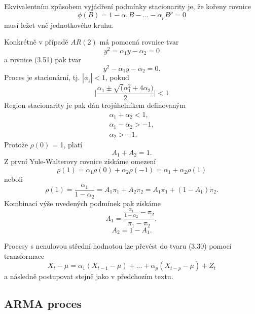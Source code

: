 Ekvivalentním způsobem vyjádření podmínky stacionarity je, že kořeny rovnice
\begin{equation}
\phi(B) = 1 - \alpha_1 B - ... - \alpha_p B^p = 0
\end{equation}
musí ležet vně jednotkového kruhu.

Konkrétně v případě $AR(2)$ má pomocná rovnice tvar
\begin{equation}
y^2 = \alpha_1 y - \alpha_2 = 0
\end{equation}
a rovnice (3.51) pak tvar
\begin{equation}
y^2 - \alpha_1 y - \alpha_2 = 0.
\end{equation}
Proces je stacionární, tj. $|\phi_i| < 1$, pokud
\begin{equation}
\Big|\frac{\alpha_1 \pm \sqrt(\alpha_1^2 + 4 \alpha_2)}{2}\Big| < 1
\end{equation}
Region stacionarity je pak dán trojúhelníkem definovaným
\begin{align}
\alpha_1 + \alpha_2 < 1,\\
\alpha_1 - \alpha_2 > -1,\\
\alpha_2 > -1.
\end{align}
Protože $\rho(0)$ = 1, platí
\begin{equation}
A_1 + A_2 = 1.
\end{equation}
Z první Yule-Walterovy rovnice získáme omezení
\begin{equation}
\rho(1) = \alpha_1 \rho(0) + \alpha_2 \rho(-1) = \alpha_1 + \alpha_2 \rho(1)
\end{equation}
neboli
\begin{equation}
\rho(1) = \frac{\alpha_1}{1 - \alpha_2} = A_1 \pi_1 + A_2 \pi_2 = A_1 \pi_1 + (1 - A_1)\pi_2.
\end{equation}
Kombinací výše uvedených podmínek pak získáme
\begin{equation}
A_1 = \frac{\frac{\alpha_1}{1 - \alpha_2} - \pi_2}{\pi_1 - \pi_2},
\end{equation}
\begin{equation}
A_2 = 1 - A_1.
\end{equation}

Procesy s nenulovou střední hodnotou lze převést do tvaru (3.30) pomocí transformace
\begin{equation}
X_t - \mu = \alpha_1(X_{t - 1} - \mu) + ... + \alpha_p (X_{t - p} - \mu) + Z_t
\end{equation}
a následně postupovat stejně jako v předchozím textu.

\subsection{ARMA proces}

